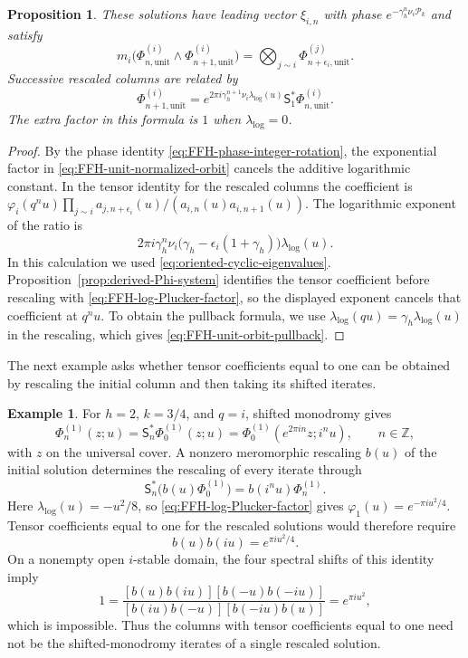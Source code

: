 \documentclass[11pt,leqno]{amsart}
\numberwithin{equation}{section}
\theoremstyle{plain}
\newtheorem{proposition}[theorem]{Proposition}
\theoremstyle{definition}
\theoremstyle{plain}
\theoremstyle{definition}
\newtheorem{example}[theorem]{Example}
\theoremstyle{remark}
\begin{document}
\begin{proposition}\label{prop:raw-unit-normalization}
These solutions have leading vector $\xi_{i,n}$ with phase
$e^{-\gamma_h^n\nu_i\mathcal P_k}$ and satisfy
\[
 m_i\bigl(\Phi_{n,\mathrm{unit}}^{(i)}\wedge
              \Phi_{n+1,\mathrm{unit}}^{(i)}\bigr)
 =\bigotimes_{j\sim i}\Phi_{n+\epsilon_i,\mathrm{unit}}^{(j)}.
\]
Successive rescaled columns are related by
\begin{equation}\label{eq:FFH-unit-orbit-pullback}
 \Phi_{n+1,\mathrm{unit}}^{(i)}
 =e^{2\pi i\gamma_h^{n+1}\nu_i\lambda_{\log}(u)}
     \mathsf S_1^*\Phi_{n,\mathrm{unit}}^{(i)}.
\end{equation}
The extra factor in this formula is $1$ when $\lambda_{\log}=0$.
\end{proposition}
\begin{proof}
By the phase identity \eqref{eq:FFH-phase-integer-rotation}, the exponential factor in \eqref{eq:FFH-unit-normalized-orbit} cancels the additive logarithmic constant.  In the tensor identity for the rescaled columns the coefficient is $\varphi_i(q^nu)\prod_{j\sim i}a_{j,n+\epsilon_i}(u)/(a_{i,n}(u)a_{i,n+1}(u))$.  The logarithmic exponent of the ratio is
\[
 2\pi i\gamma_h^n\nu_i
       \bigl(\gamma_h-\epsilon_i(1+\gamma_h)\bigr)\lambda_{\log}(u).
\]
In this calculation we used \eqref{eq:oriented-cyclic-eigenvalues}.  Proposition~\ref{prop:derived-Phi-system} identifies the tensor coefficient before rescaling with \eqref{eq:FFH-log-Plucker-factor}, so the displayed exponent cancels that coefficient at $q^nu$.  To obtain the pullback formula, we use $\lambda_{\log}(qu)=\gamma_h\lambda_{\log}(u)$ in the rescaling, which gives \eqref{eq:FFH-unit-orbit-pullback}.
\end{proof}

The next example asks whether tensor coefficients equal to one can be obtained by rescaling the initial column and then taking its shifted iterates.
\begin{example}\label{ex:typeA-logarithmic-volume}
For $h=2$, $k=3/4$, and $q=i$, shifted monodromy gives
\[
 \Phi_n^{(1)}(z;u)=\mathsf S_n^*\Phi_0^{(1)}(z;u)
 =\Phi_0^{(1)}(e^{2\pi in}z;i^nu),\qquad n\in\mathbb Z,
\]
with $z$ on the universal cover.  A nonzero meromorphic rescaling $b(u)$ of the initial solution determines the rescaling of every iterate through
\[
 \mathsf S_n^*\bigl(b(u)\Phi_0^{(1)}\bigr)
 =b(i^nu)\Phi_n^{(1)}.
\]
Here $\lambda_{\log}(u)=-u^2/8$, so \eqref{eq:FFH-log-Plucker-factor} gives $\varphi_1(u)=e^{-\pi i u^2/4}$.  Tensor coefficients equal to one for the rescaled solutions would therefore require
\begin{equation}\label{eq:rank-one-normalization-obstruction}
 b(u)b(iu)=e^{\pi i u^2/4}.
\end{equation}
On a nonempty open $i$-stable domain, the four spectral shifts of this identity imply
\[
 1=\frac{[b(u)b(iu)][b(-u)b(-iu)]}
         {[b(iu)b(-u)][b(-iu)b(u)]}
   =e^{\pi i u^2},
\]
which is impossible.  Thus the columns with tensor coefficients equal to one need not be the shifted-monodromy iterates of a single rescaled solution.
\end{example}
\end{document}

